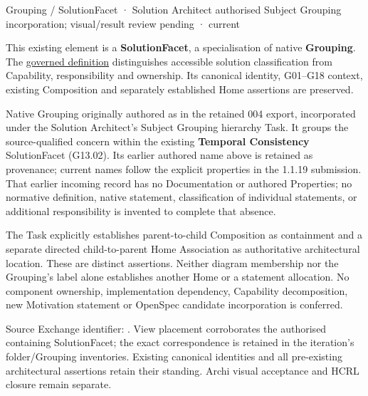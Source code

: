 \label{element:8e39da9fc2d443efa3cc5d0311fcaf79}
{\small Grouping / SolutionFacet · Solution Architect authorised Subject Grouping incorporation; visual/result review pending · current}\par

This existing element is a \textbf{SolutionFacet}, a specialisation of native
\textbf{Grouping}. The \href{\detokenize{../../../../../../../governance/continuum-representation.md#solutionfacet-classification--1119-candidate}}{governed definition}
distinguishes accessible solution classification from Capability, responsibility
and ownership. Its canonical identity, G01–G18 context, existing Composition
and separately established Home assertions are preserved.



Native Grouping originally authored as \texttt{} in the retained 004 export,
incorporated under the Solution Architect's Subject Grouping hierarchy Task.
It groups the source-qualified \texttt{} concern within
the existing \textbf{Temporal Consistency} SolutionFacet (G13.02). Its earlier authored name above is retained as provenance; current names
follow the explicit properties in the 1.1.19 submission.
That earlier incoming record has no Documentation or authored Properties; no normative
definition, native statement, classification of individual statements, or
additional responsibility is invented to complete that absence.



The Task explicitly establishes parent-to-child Composition as containment and
a separate directed child-to-parent Home Association as authoritative architectural
location. These are distinct assertions. Neither diagram membership nor the
Grouping's label alone establishes another Home or a statement allocation.
No component ownership, implementation dependency, Capability decomposition,
new Motivation statement or OpenSpec candidate incorporation is conferred.



Source Exchange identifier: \texttt{}. View placement corroborates
the authorised containing SolutionFacet; the exact correspondence is retained in the
iteration's folder/Grouping inventories. Existing canonical identities and all
pre-existing architectural assertions retain their standing. Archi visual
acceptance and HCRL closure remain separate.


